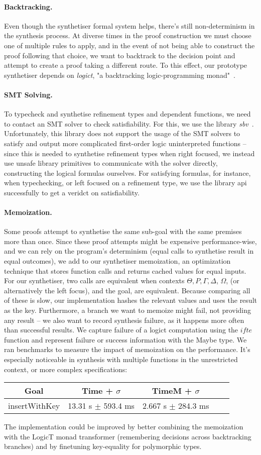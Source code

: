 \documentclass{llncs}
\newcommand{\mypara}[1]{\paragraph{\textbf{#1}.}}
\def\Rho{P}
\begin{document}
\mypara{Backtracking} Even though the synthetiser formal system helps, there's
still non-determinism in the synthesis process. At diverse times in the proof
construction we must choose one of multiple rules to apply, and in the event of
not being able to construct the proof following that choice, we want to
backtrack to the decision point and attempt to create a proof taking a different
route. To this effect, our prototype synthetiser depends on \emph{logict}, "a backtracking logic-programming
monad"~\cite{logict}.

\mypara{SMT Solving} To typecheck and synthetise refinement types and dependent
functions, we need to contact an SMT solver to check satisfiability. For this,
we use the library \emph{sbv}~\cite{sbv}. Unfortunately, this library does not
support the usage of the SMT solvers to satisfy and output more complicated
first-order logic uninterpreted functions -- since this is needed to synthetise refinement types
when right focused, we instead use unsafe library primitives to communicate with
the solver directly, constructing the logical formulas ourselves. For 
satisfying formulas, for instance, when typechecking, or left focused on a
refinement type, we use the library api successfully to get a veridct on
satisfiability.

\mypara{Memoization} Some proofs attempt to synthetise the same sub-goal with
the same premises more than once. Since these proof attempts might be expensive
performance-wise, and we can rely on the program's determinism (equal calls to
synthetise result in equal outcomes), we add to our synthetiser memoization, an
optimization technique that stores function calls and returns cached values for
equal inputs. For our synthetiser, two calls are equivalent when contexts
$\Theta, \Rho, \Gamma, \Delta$, $\Omega$, (or alternatively the left focus), and
the goal, are equivalent. Because comparing all of these is slow, our
implementation hashes the relevant values and uses the result as the key.
Furthermore, a branch we want to memoize might fail, not providing any result --
we also want to record synthesis failure, as it happens more often than
successful results. We capture failure of a logict computation using the $ifte$
function and represent failure or success information with the Maybe type. We
ran benchmarks to measure the impact of memoization on the performance. It's
especially noticeable in synthesis with multiple functions in the unrestricted
context, or more complex specifications:
%
\begin{center}
    \begin{tabular}{ |c|c|c|c|c| }
        \hline
        Goal & Time + $\sigma$ & TimeM + $\sigma$ \\
        \hline
        insertWithKey & 13.31 s $\pm$ 593.4 ms & 2.667 s $\pm$ 284.3 ms \\
        \hline
    \end{tabular}
\end{center}
%
The implementation could be improved by better combining the
memoization with the LogicT monad transformer (remembering decisions across
backtracking branches) and by finetuning key-equality for polymorphic types.
\end{document}
